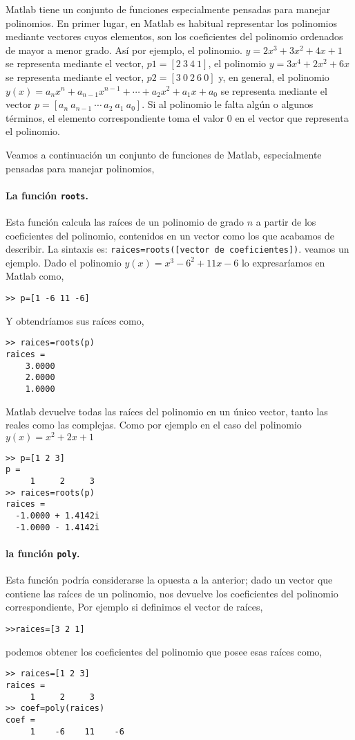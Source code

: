 Matlab tiene un conjunto de funciones especialmente pensadas para  manejar polinomios. En primer lugar, en Matlab es habitual representar los polinomios mediante vectores cuyos elementos, son los coeficientes del polinomio ordenados de mayor a menor grado. Así por ejemplo, el polinomio. $y=2x^3+3x^2+4x+1$ se representa mediante el vector, $p1=[2\ 3\ 4\ 1]$,  el polinomio $y=3x^4+2x^2+6x$ se representa mediante el vector,  $p2=[3\ 0\ 2\ 6\ 0]$ y, en general, el polinomio $y(x)=a_nx^n+a_{n-1}x^{n-1}+\cdots+a_2x^2+a_1x+a_0$  se representa mediante el vector $p=[a_n\ a_{n-1}\ \cdots\ a_2\ a_1\ a_0]$. Si al polinomio le falta algún o algunos términos, el elemento correspondiente toma el valor $0$ en el vector que representa el polinomio.

Veamos a continuación un conjunto de funciones de Matlab, especialmente pensadas para manejar polinomios,

\paragraph{La función \texttt{roots}.} Esta función calcula las raíces de un polinomio de grado $n$ a partir de los coeficientes del polinomio, contenidos en un vector como los que acabamos de describir. La sintaxis es: \texttt{raices=roots([vector de coeficientes])}. veamos un ejemplo. Dado el polinomio $y(x)=x^3-6^2+11x-6$ lo expresaríamos en Matlab como,

\begin{verbatim}
>> p=[1 -6 11 -6]
\end{verbatim}

Y obtendríamos sus raíces como,

\begin{verbatim}
>> raices=roots(p)
raices =
    3.0000
    2.0000
    1.0000

\end{verbatim}

Matlab devuelve todas las raíces del polinomio en un único vector, tanto las reales como las complejas. Como por ejemplo en el caso del polinomio $y(x)=x^2+2x+1$

\begin{verbatim}
>> p=[1 2 3]
p =
     1     2     3
>> raices=roots(p)
raices =
  -1.0000 + 1.4142i
  -1.0000 - 1.4142i
\end{verbatim}

\paragraph{la función \texttt{poly}.} Esta función podría considerarse la opuesta a la anterior; dado un vector que contiene las raíces de un polinomio, nos devuelve los coeficientes del polinomio correspondiente, Por ejemplo si definimos el vector de raíces, 
\begin{verbatim}
>>raices=[3 2 1]
\end{verbatim}
podemos obtener los coeficientes del polinomio que posee esas raíces como,
\begin{verbatim}
>> raices=[1 2 3]
raices =
     1     2     3
>> coef=poly(raices)
coef =
     1    -6    11    -6
\end{verbatim}

